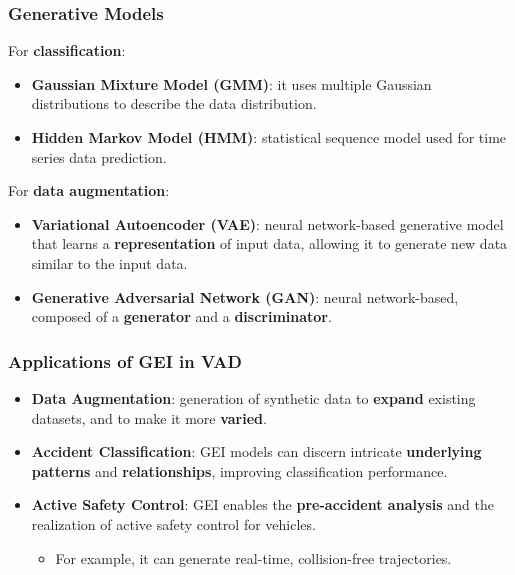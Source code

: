 \documentclass{beamer}
\begin{document}
\begin{frame}
  \frametitle{Generative Models}
  For \textbf{classification}:
  \begin{itemize}
    \item \textbf{Gaussian Mixture Model
    (GMM)}: it uses multiple Gaussian distributions to
    describe the data distribution.
    \item \textbf{Hidden Markov
    Model (HMM)}: statistical sequence model used for time series data prediction.
  \end{itemize}
  For \textbf{data augmentation}:
  \begin{itemize}
    \item \textbf{Variational Autoencoder (VAE)}: neural network-based generative model that learns a
    \textbf{representation} of input data, allowing it to generate
    new data similar to the input data.
    \item \textbf{Generative Adversarial Network (GAN)}: neural network-based, composed of
    a \textbf{generator} and a \textbf{discriminator}.

  \end{itemize}
\end{frame}


\begin{frame}
  \frametitle{Applications of GEI in VAD}
  \begin{itemize}
    \item \textbf{Data Augmentation}: generation of synthetic data to \textbf{expand} existing
    datasets, and to make it more \textbf{varied}.
    \item \textbf{Accident Classification}: GEI models can discern intricate \textbf{underlying patterns}
     and \textbf{relationships}, improving classification performance.
    \item \textbf{Active Safety Control}: GEI enables
    the \textbf{pre-accident analysis} and the realization
    of active safety control for vehicles. 
    \begin{itemize}
      \item For example, it can generate real-time,
      collision-free trajectories.
    \end{itemize}
  \end{itemize}
\end{frame}
\end{document}
